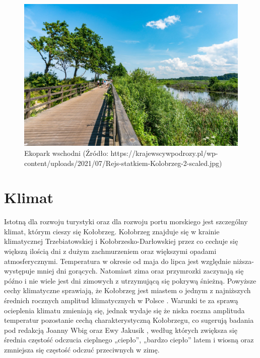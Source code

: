 \documentclass{amuthesis}
\begin{document}
\begin{figure}[t]

{\centering \includegraphics[width=1.05\linewidth]{figures/ekopark_wschodni} 

}

\caption{Ekopark wschodni (Źródło: https://krajewscywpodrozy.pl/wp-content/uploads/2021/07/Rejs-statkiem-Kolobrzeg-2-scaled.jpg)}\label{fig:ryc12}
\end{figure}

\hypertarget{klimat}{%
\section{Klimat}\label{klimat}}

Istotną dla rozwoju turystyki oraz dla rozwoju portu morskiego jest szczególny klimat, którym cieszy się Kołobrzeg.
Kołobrzeg znajduje się w krainie klimatycznej Trzebiatowskiej i Kołobrzesko-Darłowskiej przez co cechuje się większą ilością dni z dużym zachmurzeniem oraz większymi opadami atmosferycznymi.
Temperatura w okresie od maja do lipca jest względnie niższa- występuje mniej dni gorących.
Natomiast zima oraz przymrozki zaczynają się późno i nie wiele jest dni zimowych z utrzymującą się pokrywą śnieżną.
Powyższe cechy klimatyczne sprawiają, że Kołobrzeg jest miastem o jednym z najniższych średnich rocznych amplitud klimatycznych w Polsce \autocite{strategia_promocji}.
Warunki te za sprawą ocieplenia klimatu zmieniają się, jednak wydaje się że niska roczna amplituda temperatur pozostanie cechą charakterystyczną Kołobrzegu, co sugerują badania pod redakcją Joanny Wbig oraz Ewy Jakusik \autocite{wibig}, według których zwiększa się średnia częstość odczucia cieplnego „ciepło'', „bardzo ciepło'' latem i wiosną oraz zmniejsza się częstość odczuć przeciwnych w zimę.
\end{document}
